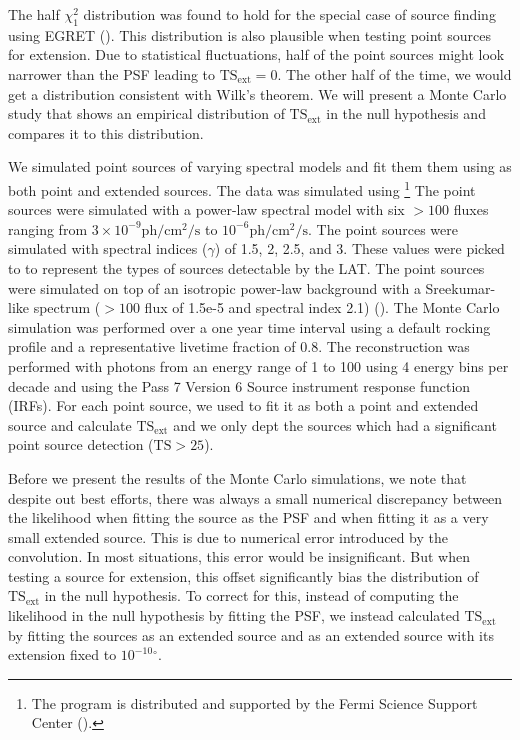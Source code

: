 \documentclass[12pt,preprint]{aastex}
\newcommand{\mev}{\text{MeV}\xspace}
\newcommand{\gev}{\text{GeV}\xspace}
\newcommand{\ph}{\text{ph}\xspace}
\newcommand{\cm}{\text{cm}\xspace}
\renewcommand{\sec}{\text{s}\xspace}
\newcommand{\tsext}{{\ensuremath{\text{TS}_\text{ext}}}\xspace}
\newcommand{\ts}{\text{TS}\xspace}
\renewcommand{\deg}{\ensuremath{^\circ}\xspace}
\newcommand{\pointlike}{\text{\em pointlike}\xspace}
\newcommand{\gtobssim}{\text{\em gtobssim}\xspace}
\begin{document}
The half $\chi^2_1$ distribution was found to hold for the special case
of source finding using EGRET (\cite{mattox_egret}). This distribution
is also plausible when testing point sources for extension. Due to
statistical fluctuations, half of the point sources might look narrower
than the PSF leading to $\tsext=0$. The other half of the time, we would
get a distribution consistent with Wilk's theorem. We will present a
Monte Carlo study that shows an empirical distribution of \tsext in the
null hypothesis and compares it to this distribution.

We simulated point sources of varying spectral models and fit them
them using \pointlike as both point and extended sources. The data was
simulated using \gtobssim\footnote{The \gtobssim program is distributed
and supported by the Fermi Science Support Center (\cite{fssc}).}
The point sources were simulated with a power-law spectral model with
six $>100$ \mev fluxes ranging from $3\times 10^{-9} \ph/\cm^2/\sec$ to
$10^{-6} \ph/\cm^2/\sec$.  The point sources were simulated with spectral
indices ($\gamma$) of 1.5, 2, 2.5, and 3.  These values were picked to
to represent the types of sources detectable by the LAT.  The point
sources were simulated on top of an isotropic power-law background
with a Sreekumar-like spectrum ($>100$ \mev flux of 1.5e-5 and spectral
index 2.1) (\cite{sreekumar_isotropic}).  The Monte Carlo simulation was
performed over a one year time interval using a default rocking profile
and a representative livetime fraction of 0.8.  The reconstruction was
performed with photons from an energy range of 1 \gev to 100 \gev using 4
energy bins per decade and using the Pass 7 Version 6 Source instrument
response function (IRFs).  For each point source, we used \pointlike
to fit it as both a point and extended source and calculate \tsext and
we only dept the sources which had a significant point source detection
($\ts>25$).

Before we present the results of the Monte Carlo simulations, we note
that despite out best efforts, there was always a small numerical
discrepancy between the likelihood when fitting the source as the PSF
and when fitting it as a very small extended source. This is due to
numerical error introduced by the convolution.  In most situations, this
error would be insignificant. But when testing a source for extension,
this offset significantly bias the distribution of \tsext in the null
hypothesis. To correct for this, instead of computing the likelihood in
the null hypothesis by fitting the PSF, we instead calculated \tsext by
fitting the sources as an extended source and as an extended source with
its extension fixed to ${10^{-10}}\deg$.
\end{document}
